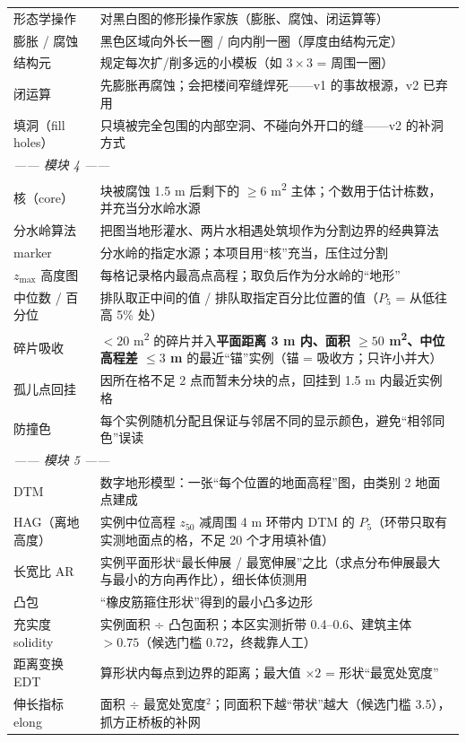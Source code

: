 \begin{center}
\begin{tabular}{p{3.4cm}p{11.2cm}}
形态学操作 & 对黑白图的修形操作家族（膨胀、腐蚀、闭运算等） \\
膨胀 / 腐蚀 & 黑色区域向外长一圈 / 向内削一圈（厚度由结构元定） \\
结构元 & 规定每次扩/削多远的小模板（如 $3\times3$ = 周围一圈） \\
闭运算 & 先膨胀再腐蚀；会把楼间窄缝焊死——v1 的事故根源，v2 已弃用 \\
填洞（fill holes） & 只填被完全包围的内部空洞、不碰向外开口的缝——v2 的补洞方式 \\
\multicolumn{2}{l}{\emph{—— 模块 4 ——}} \\
核（core） & 块被腐蚀 1.5 m 后剩下的 $\geq6$ m\textsuperscript{2} 主体；个数用于估计栋数，并充当分水岭水源 \\
分水岭算法 & 把图当地形灌水、两片水相遇处筑坝作为分割边界的经典算法 \\
marker & 分水岭的指定水源；本项目用``核''充当，压住过分割 \\
$z_{\max}$ 高度图 & 每格记录格内最高点高程；取负后作为分水岭的``地形'' \\
中位数 / 百分位 & 排队取正中间的值 / 排队取指定百分比位置的值（$P_5$ = 从低往高 5\% 处） \\
碎片吸收 & $<20$ m\textsuperscript{2} 的碎片并入\textbf{平面距离 3 m 内、面积 $\geq50$ m\textsuperscript{2}、中位高程差 $\leq3$ m} 的最近``锚''实例（锚 = 吸收方；只许小并大） \\
孤儿点回挂 & 因所在格不足 2 点而暂未分块的点，回挂到 1.5 m 内最近实例格 \\
防撞色 & 每个实例随机分配且保证与邻居不同的显示颜色，避免``相邻同色''误读 \\
\multicolumn{2}{l}{\emph{—— 模块 5 ——}} \\
DTM & 数字地形模型：一张``每个位置的地面高程''图，由类别 2 地面点建成 \\
HAG（离地高度） & 实例中位高程 $z_{50}$ 减周围 4 m 环带内 DTM 的 $P_5$（环带只取有实测地面点的格，不足 20 个才用填补值） \\
长宽比 AR & 实例平面形状``最长伸展 / 最宽伸展''之比（求点分布伸展最大与最小的方向再作比），细长体侦测用 \\
凸包 & ``橡皮筋箍住形状''得到的最小凸多边形 \\
充实度 solidity & 实例面积 ÷ 凸包面积；本区实测折带 0.4--0.6、建筑主体 $>0.75$（候选门槛 0.72，终裁靠人工） \\
距离变换 EDT & 算形状内每点到边界的距离；最大值 $\times2$ = 形状``最宽处宽度'' \\
伸长指标 elong & 面积 $\div$ 最宽处宽度$^2$；同面积下越``带状''越大（候选门槛 3.5），抓方正桥板的补网 \\

\end{tabular}
\end{center}

